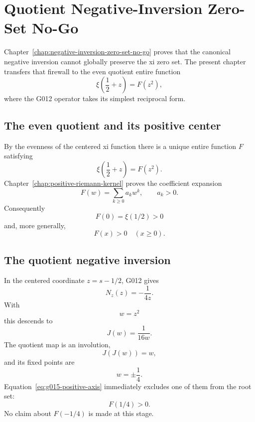 \chapter{Quotient Negative-Inversion Zero-Set No-Go}
\label{chap:quotient-negative-inversion-zero-set-no-go}


Chapter~\ref{chap:negative-inversion-zero-set-no-go} proves that the canonical
negative inversion cannot globally preserve the xi zero set.  The present
chapter transfers that firewall to the even quotient entire function
\[
 \xi\!\left(\frac12+z\right)=F(z^2),
\]
where the G012 operator takes its simplest reciprocal form.

\section{The even quotient and its positive center}

By the evenness of the centered xi function there is a unique entire function
$F$ satisfying
\begin{equation}
 \xi\!\left(\frac12+z\right)=F(z^2).
 \label{eq:g015-F-def}
\end{equation}
Chapter~\ref{chap:positive-riemann-kernel} proves the coefficient expansion
\begin{equation}
 F(w)=\sum_{k\ge0}a_k w^k,
 \qquad a_k>0.
 \label{eq:g015-positive-coefficients}
\end{equation}
Consequently
\begin{equation}
 \boxed{F(0)=\xi(1/2)>0}
 \label{eq:g015-F0-positive}
\end{equation}
and, more generally,
\begin{equation}
 \boxed{F(x)>0\quad(x\ge0).}
 \label{eq:g015-positive-axis}
\end{equation}

\section{The quotient negative inversion}

In the centered coordinate $z=s-1/2$, G012 gives
\[
 N_z(z)=-\frac1{4z}.
\]
With
\[
 w=z^2
\]
this descends to
\begin{equation}
 \boxed{
 J(w)=\frac1{16w}.
 }
 \label{eq:g015-J}
\end{equation}
The quotient map is an involution,
\[
 J(J(w))=w,
\]
and its fixed points are
\begin{equation}
 \boxed{w=\pm\frac14.}
 \label{eq:g015-fixed-values}
\end{equation}
Equation~\eqref{eq:g015-positive-axis} immediately excludes one of them from
the root set:
\begin{equation}
 \boxed{F(1/4)>0.}
 \label{eq:g015-plus-quarter-nonroot}
\end{equation}
No claim about $F(-1/4)$ is made at this stage.


